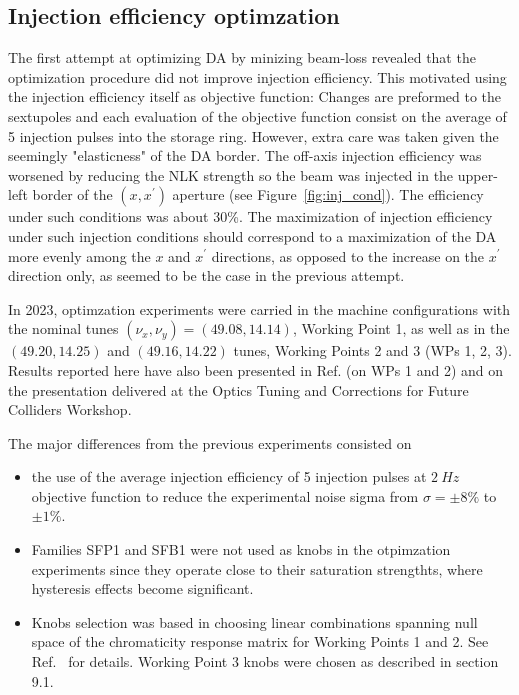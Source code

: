 
\subsection{Injection efficiency optimzation}
The first attempt at optimizing DA by minizing beam-loss revealed that the optimization procedure did not improve injection efficiency. This motivated using the injection efficiency itself as objective function: Changes are preformed to the sextupoles and each evaluation of the objective function consist on the average of 5 injection pulses into the storage ring. However, extra care was taken given the seemingly "elasticness" of the DA border. The off-axis injection efficiency was worsened by reducing the NLK strength
    so the beam was injected in the upper-left border of the  $(x,x^\prime)$ aperture (see Figure~\ref{fig:inj_cond}). The efficiency under such conditions was about 30\%. The maximization of injection efficiency under such injection conditions should correspond to a maximization of the DA more evenly among the $x$ and $x^{\prime}$ directions, as opposed to the increase on the $x^\prime$ direction only, as seemed to be the case in the previous attempt.

In 2023, optimzation experiments were carried in the machine configurations with the nominal tunes $(\nu_x,\nu_y)=(49.08, 14.14)$, Working Point 1, as well as in the $(49.20, 14.25)$ and $(49.16, 14.22)$ tunes, Working Points 2 and 3 (WPs 1, 2, 3). Results reported here have also been presented in Ref.\cite{velloso:ipac23-wepl087} (on WPs 1 and 2) and on the presentation  delivered at the Optics Tuning and Corrections for Future Colliders Workshop.

The major differences from the previous experiments consisted on
\begin{itemize}
    \item the use of the average injection efficiency of 5 injection pulses at $2~\unit{Hz}$ objective function to reduce the experimental noise sigma from $\sigma=\pm8\%$ to $\pm1\%$.
    \item Families SFP1 and SFB1 were not used as knobs in the otpimzation experiments since they operate close to their saturation strengthts, where hysteresis effects become significant.
    \item Knobs selection was based in choosing linear combinations spanning null space of the chromaticity response matrix for Working Points 1 and 2. See Ref.~\cite{velloso:ipac23-wepl087} for details. Working Point 3 knobs were chosen as described in section 9.1.
\end{itemize}
